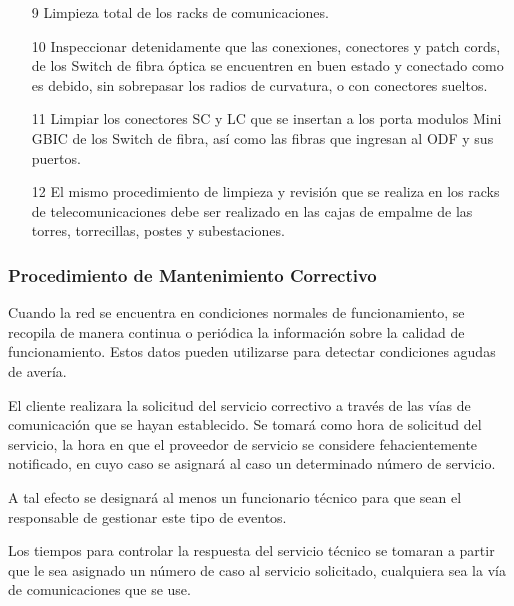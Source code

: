 \begin{enumerate}

\item[9]Limpieza total de los racks de comunicaciones.



\item[10]Inspeccionar detenidamente que las conexiones, conectores y patch cords, de los Switch de fibra óptica se encuentren en buen estado y conectado como es debido, sin sobrepasar los radios de curvatura, o con conectores sueltos.



\item[11]Limpiar los conectores SC y LC que se insertan a los porta modulos Mini GBIC de los Switch de fibra, así como las fibras que ingresan al ODF y sus puertos.







\item[12]  El mismo procedimiento de limpieza y revisión que se realiza en los racks de telecomunicaciones debe ser realizado en las cajas de empalme de las torres,  torrecillas, postes y subestaciones.






\end{enumerate}





\subsubsection{Procedimiento de Mantenimiento Correctivo}
Cuando la red se encuentra en condiciones normales de funcionamiento, se recopila de manera continua o
periódica la información sobre la calidad de funcionamiento. Estos datos pueden utilizarse para detectar condiciones agudas de avería.

El cliente realizara la solicitud del servicio correctivo a través de las vías de comunicación que se hayan establecido. Se tomará como hora de solicitud del servicio, la hora en que el proveedor de servicio se considere fehacientemente notificado, en cuyo caso se asignará al caso un determinado número de servicio. 

A tal efecto se designará al menos un funcionario técnico para que sean el responsable de gestionar este tipo de eventos.

Los tiempos para controlar la respuesta del servicio técnico se tomaran a partir que le sea asignado un número de caso al servicio solicitado, cualquiera sea la vía de comunicaciones que se use.

